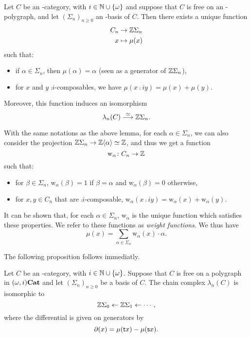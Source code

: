 \documentclass{amsart}
\renewcommand{\sce}[1]{\source{} #1}
\renewcommand{\tge}[1]{\target{} #1}
\newcommand{\wght}[1]{\mathrm{w}_{#1}}
\newcommand{\tw}[1]{\mu(#1)} %
\begin{document}
\begin{lemma}\label{lemma:abelpol}
  Let $C$ be an \nbd-category, with $i \in \mathbb N\cup\left\{\omega\right\}$
  and suppose that $C$ is free on an \nbd-polygraph, and let
  $(\Sigma_n)_{n\geq 0}$ an \nbd-basis of $C$. Then there
  exists a unique function
  \[
    \begin{aligned}
      C_n &\to \Z\Sigma_n\\
      x &\mapsto \tw{x}
    \end{aligned}
  \]
  such that:
  \begin{itemize}
    \item if $\alpha \in \Sigma_n$, then $\tw{\alpha}=\alpha$ (seen as a generator of
      $\mathbb Z\Sigma_n$),
    \item for $x$ and $y$ $\comp{i}$\nbd-composables, we have $\tw{x\comp{i} y}=\tw{x}+\tw{y}$.
    \end{itemize}
    Moreover, this function induces an isomorphism
    \[
      \lambda_n(C) \overset{\simeq}{\longrightarrow} \mathbb Z\Sigma_n.
    \]
  \end{lemma}
  \begin{paragr}
  With the same notations as the above lemma, for each $\alpha \in
  \Sigma_n$, we can also consider the projection $\mathbb Z \Sigma_n \to \mathbb Z
  \langle \alpha \rangle \simeq \mathbb Z$, and thus we get a
  function
  \[
    \wght{\alpha} \colon C_n \to \Z
  \]
  such that:
  \begin{itemize}
    \item for $\beta \in \Sigma_n$, $\wght{\alpha}(\beta)=1$ if $\beta=\alpha$ and $\wght{\alpha}(\beta)=0$
      otherwise,
    \item for $x,y \in C_n$ that are $\comp{i}$\nbd-composable, $\wght{\alpha}(x\comp{i}y)=\wght{\alpha}(x)+\wght{\alpha}(y)$.
    \end{itemize}
    It can be shown that, for each $\alpha \in \Sigma_n$, $\wght{\alpha}$ is the unique function which
    satisfies these properties. We refer to these functions as \emph{weight functions}. We thus
    have
    \[
      \tw{x}=\sum_{\alpha \in \Sigma_n}\wght{\alpha}(x)\cdot \alpha.
    \]
\end{paragr}
The following proposition follows immediatly.
\begin{proposition}
  Let $C$ be an  \nbd-category, with $i \in \mathbb N\cup
  \left\{\omega\right\}$. Suppose that $C$ is free on a polygraph in
  $(\omega,i)\mathbf{Cat}$ and let $(\Sigma_n)_{n \geq 0}$ be a basis of $C$. The
  chain complex $\lambda_n(C)$ is isomorphic to
  \[
    \mathbb Z \Sigma_0 \leftarrow \mathbb Z \Sigma_1 \leftarrow \cdots,
  \]
  where the differential is given on generators by
  \[
    \partial(x)=\tw{\tge{x}}-\tw{\sce{x}}.
  \]
\end{proposition}
\end{document}
